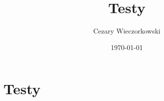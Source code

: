\documentclass[../main.tex]{subfiles}
\author{Cezary Wieczorkowski}
\date{\today}
\title{Testy}
\begin{document}
\section{Testy}
\end{document}
